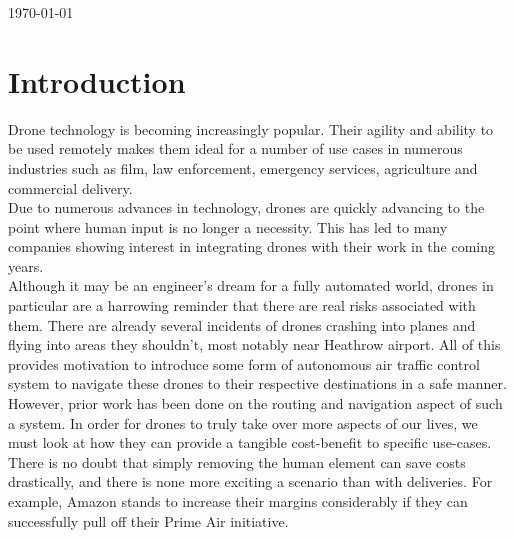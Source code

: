 \documentclass[a4paper,12pt,titlepage]{article}
\begin{document}
\begin{titlepage}

{\large \today}\\[0.5cm] %


\vfill %

\end{titlepage}

%

\newpage

\tableofcontents

\newpage

\section{Introduction}
Drone technology is becoming increasingly popular. Their agility and ability to be used remotely makes them ideal for a number of use cases in  numerous industries such as film, law enforcement, emergency services, agriculture and commercial delivery\cite{Koontz}. \\

Due to numerous advances in technology, drones are quickly advancing to the point where human input is no longer a necessity. This has led to many companies showing interest in integrating drones with their work in the coming years. \\

Although it may be an engineer's dream for a fully automated world, drones in particular are a harrowing reminder that there are real risks associated with them. There are already several incidents of drones crashing into planes and flying into areas they shouldn't, most notably near Heathrow airport\cite{BBCNews2017}. All of this provides motivation to introduce some form of autonomous air traffic control system to navigate these drones to their respective destinations in a safe manner.\\

However, prior work has been done on the routing and navigation aspect of such a system. In order for drones to truly take over more aspects of our lives, we must look at how they can provide a tangible cost-benefit to specific use-cases. There is no doubt that simply removing the human element can save costs drastically, and there is none more exciting a scenario than with deliveries. For example, Amazon stands to increase their margins considerably if they can successfully pull off their Prime Air initiative\cite{Welch2015}.
\end{document}
